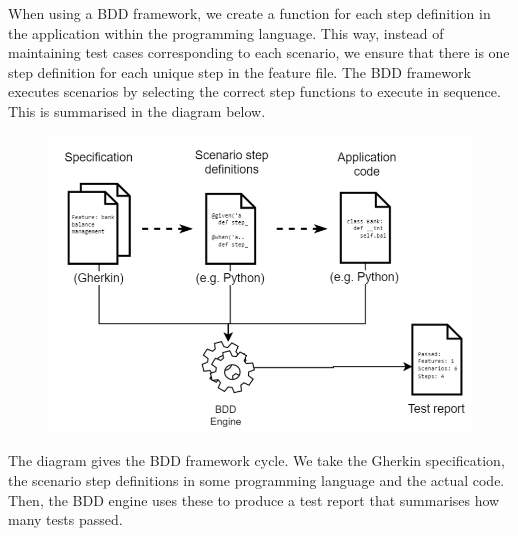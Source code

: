 \documentclass[a4paper, openany]{memoir}
\begin{document}
When using a BDD framework, we create a function for each step definition in the application within the programming language. This way, instead of maintaining test cases corresponding to each scenario, we ensure that there is one step definition for each unique step in the feature file. The BDD framework executes scenarios by selecting the correct step functions to execute in sequence. This is summarised in the diagram below.
\begin{figure}[H]
    \centering
    \includegraphics[scale=0.6]{src/11 BDD Framework cycle.PNG}
\end{figure}
\noindent The diagram gives the BDD framework cycle. We take the Gherkin specification, the scenario step definitions in some programming language and the actual code. Then, the BDD engine uses these to produce a test report that summarises how many tests passed.
\end{document}
